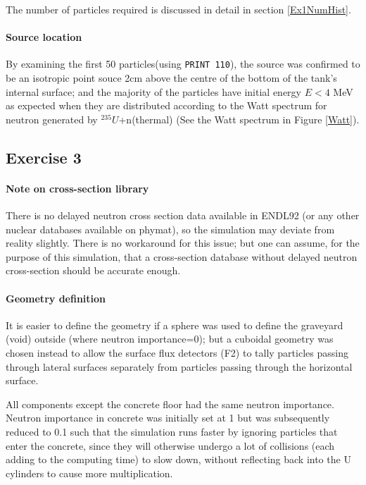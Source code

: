 \documentclass[a4paper, 11pt]{article}
\begin{document}
The number of particles required is discussed in detail in section \ref{Ex1NumHist}.

\paragraph{Source location\indent}By examining the first 50 particles(using \texttt{PRINT 110}), the source was confirmed to be an isotropic point souce 2cm above the centre of the bottom of the tank's internal surface; and the majority of the particles have initial energy $E<4$ MeV as expected when they are distributed according to the Watt spectrum for neutron generated by ${}^{235}U$+n(thermal) (See the Watt spectrum in Figure \ref{Watt}).

\subsection{Exercise 3}
\paragraph{Note on cross-section library\indent} There is no delayed neutron cross section data available in ENDL92 (or any other nuclear databases available on phymat), so the simulation may deviate from reality slightly. There is no workaround for this issue; but one can assume, for the purpose of this simulation, that a cross-section database without delayed neutron cross-section should be accurate enough.

\paragraph{Geometry definition\indent} It is easier to define the geometry if a sphere was used to define the graveyard (void) outside (where neutron importance=0); but a cuboidal geometry was chosen instead to allow the surface flux detectors (F2) to tally particles passing through lateral surfaces separately from particles passing through the horizontal surface.

All components except the concrete floor had the same neutron importance. Neutron importance in concrete was initially set at 1 but was subsequently reduced to 0.1 such that the simulation runs faster by ignoring particles that enter the concrete, since they will otherwise undergo a lot of collisions (each adding to the computing time) to slow down, without reflecting back into the U cylinders to cause more multiplication.
\end{document}
